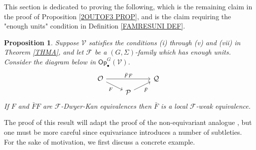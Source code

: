 \documentclass[a4paper,10pt
,draft
]{article}%
\numberwithin{equation}{section}
\numberwithin{figure}{section}
\newtheorem{proposition}[equation]{Proposition}%
\theoremstyle{definition} %
\newcommand{\F}{\ensuremath{\mathcal F}}
\newcommand{\V}{\ensuremath{\mathcal V}}
\renewcommand{\O}{\ensuremath{\mathcal O}}
\newcommand{\1}{\ensuremath{\mathbbm 1}}%
\begin{document}
This section is dedicated to proving the following, 
which is the remaining claim in the proof of Proposition \ref{2OUTOF3 PROP},
and is the claim requiring
the "enough units" condition in Definition \ref{FAMRESUNI DEF}.


\begin{proposition}\label{23HARDCASE PROP}
Suppose $\V$ satisfies the conditions 
(i) through (v) and (vii) in Theorem \ref{THMA},
and let $\F$ be a $(G,\Sigma)$-family which has enough units. 
%
Consider the diagram below 
in $\mathsf{Op}^G_\bullet(\V)$.
\begin{equation}\label{23HARDDIAG EQ}
	\begin{tikzcd}[row sep=5pt]
		\O \arrow{rr}{\bar{F}F}
		\arrow{dr}[swap]{F}
	&&
		\mathcal{Q} 
	\\
	&
		\mathcal{P} \ar{ru}[swap]{\bar{F}}
	\end{tikzcd}
\end{equation}
If $F$ and $\bar{F}F$ are $\F$-Dwyer-Kan equivalences
then $\bar{F}$ is a local $\F$-weak equivalence.
\end{proposition}



The proof of this result will adapt the proof of the non-equivariant analogue \cite[Lemma 4.14]{Cav},
but one must be more careful since equivariance introduces a number of subtleties.
For the sake of motivation, 
we first discuss a concrete example.
\end{document}
